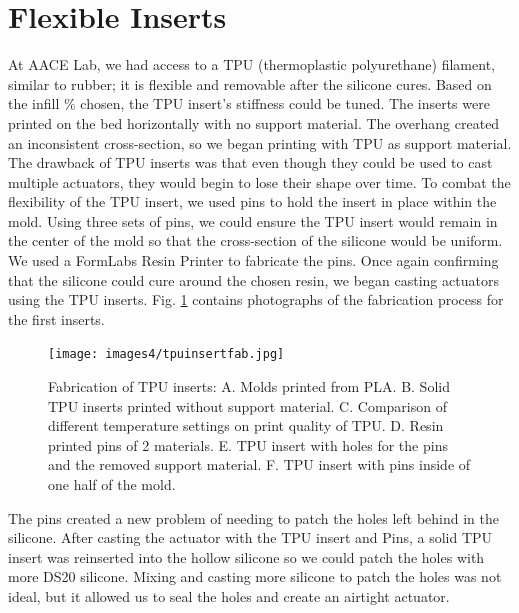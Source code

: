 \section{Flexible Inserts}
At AACE Lab, we had access to a TPU (thermoplastic polyurethane) filament, similar to rubber; it is flexible and removable after the silicone cures. Based on the infill \% chosen, the TPU insert's stiffness could be tuned. The inserts were printed on the bed horizontally with no support material. The overhang created an inconsistent cross-section, so we began printing with TPU as support material. The drawback of TPU inserts was that even though they could be used to cast multiple actuators, they would begin to lose their shape over time. To combat the flexibility of the TPU insert, we used pins to hold the insert in place within the mold. Using three sets of pins, we could ensure the TPU insert would remain in the center of the mold so that the cross-section of the silicone would be uniform. We used a FormLabs Resin Printer to fabricate the pins. Once again confirming that the silicone could cure around the chosen resin, we began casting actuators using the TPU inserts. Fig. \ref{fig:tpuinsert} contains photographs of the fabrication process for the first inserts. 

\begin{figure}[h]
    \centering
    \texttt{[image: images4/tpuinsertfab.jpg]}
    \caption{Fabrication of TPU inserts: A. Molds printed from PLA. B. Solid TPU inserts printed without support material. C. Comparison of different temperature settings on print quality of TPU. D. Resin printed pins of 2 materials. E. TPU insert with holes for the pins and the removed support material. F. TPU insert with pins inside of one half of the mold.}
    \label{fig:tpuinsert}
\end{figure}

The pins created a new problem of needing to patch the holes left behind in the silicone. After casting the actuator with the TPU insert and Pins, a solid TPU insert was reinserted into the hollow silicone so we could patch the holes with more DS20 silicone. Mixing and casting more silicone to patch the holes was not ideal, but it allowed us to seal the holes and create an airtight actuator. 

\clearpage
